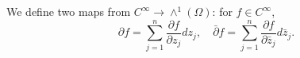 
We define two maps from $C^\infty \to \wedge^1(\Omega)$: for $f \in C^\infty$,
$$\partial f = \sum_{j=1}^{n} \frac{\partial f}{\partial z_j} dz_j, \quad \bar{\partial} f = \sum_{j=1}^{n} \frac{\partial f}{\partial \bar{z}_j} d\bar{z}_j.$$
